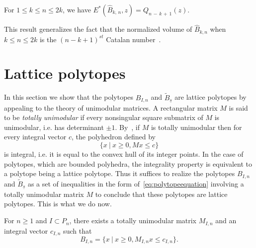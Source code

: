 \begin{theo}\label{thm:Narayana}
For $1 \leq k \leq n \leq 2k$, we have $E^*(\hat{B}_{k,\,n},z)=Q_{n\,-\,k\,+\,1}(z)$.
\end{theo}

This result generalizes the fact that the normalized volume of $\hat{B}_{k,n}$ when $k \leq n \leq 2k$ is the $(n-k+1)^{st}$ Catalan number~\cite[Exercise~4.56$\MK$(e)]{S12}.

\section{Lattice polytopes}\label{sec:lattice}

In this section we show that the polytopes $B_{I,n}$ and $\widetilde{B}_{\underline{s}}$ are lattice polytopes by appealing to the theory of unimodular matrices. A rectangular matrix $M$ is said to be \emph{totally unimodular} if every nonsingular square submatrix of $M$ is unimodular, i.e. has determinant $\pm 1$. By~\cite[Theorem~19.1]{schrijver-1986}, if $M$ is totally unimodular then for every integral vector $c$, the polyhedron defined by
\begin{equation}\label{eq:polytopeequation}
\{x \: | \: x \geq 0, Mx \leq c \}
\end{equation}
is integral, i.e. it is equal to the convex hull of its integer points. In the case of polytopes, which are bounded polyhedra, the integrality property is equivalent to a polytope being a lattice polytope. Thus it suffices to realize the polytopes $B_{I,n}$ and $\widetilde{B}_{\underline{s}}$ as a set of inequalities in the form of~\eqref{eq:polytopeequation} involving a totally unimodular matrix $M$ to conclude that these polytopes are lattice polytopes. This is what we do now.

\begin{lemm}\label{lem:BIintegral}
For $n\geq 1$ and $I\subset P_n$, there exists a totally unimodular matrix $M_{I,n}$ and an integral vector $c_{I,n}$ such that
\[
B_{I,n}=\{x \: | \: x \geq 0, M_{I,n}x \leq c_{I,n} \}.
\]
\end{lemm}

